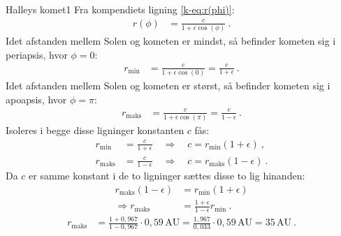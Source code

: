 \begin{opgave}{Halleys komet}{1}
\opg Fra kompendiets ligning \eqref{k-eq:r(phi)}:
\begin{align*}
	r(\phi) &= \frac{c}{1+\epsilon\cos(\phi)} \: .
\end{align*}
Idet afstanden mellem Solen og kometen er mindst, så befinder kometen sig i periapsis, hvor $\phi = 0$:
\begin{align*}
	r_{\mathrm{min}} &= \frac{c}{1+\epsilon\cos(0)}
	= \frac{c}{1+\epsilon} \: .
\end{align*}
Idet afstanden mellem Solen og kometen er størst, så befinder kometen sig i apoapsis, hvor $\phi = \pi$:
\begin{align*}
	r_{\mathrm{maks}} &= \frac{c}{1+\epsilon\cos(\pi)}
	= \frac{c}{1-\epsilon} \: .
\end{align*}
Isoleres i begge disse ligninger konstanten $c$ fås:
\begin{align*}
	r_{\mathrm{min}} &= \frac{c}{1+\epsilon} \quad \Rightarrow \quad c = r_{\mathrm{min}} (1+\epsilon) \: ,\\
	r_{\mathrm{maks}} &= \frac{c}{1-\epsilon} \quad \Rightarrow \quad c = r_{\mathrm{maks}} (1-\epsilon) \: .
\end{align*}
Da $c$ er samme konstant i de to ligninger sættes disse to lig hinanden:
\begin{align*}
	r_{\mathrm{maks}} (1-\epsilon) &= r_{\mathrm{min}} (1+\epsilon) \\
	\Rightarrow r_{\mathrm{maks}} &= \frac{1+\epsilon}{1-\epsilon} r_{\mathrm{min}} \: .
\end{align*}
%
\opg \begin{align*}
	r_{\mathrm{maks}} &= \frac{1+0,967}{1-0,967} \cdot 0,59 \, \text{AU} = \frac{1,967}{0,033} \cdot 0,59 \, \text{AU} = 35 \, \text{AU} \: .
\end{align*}
\end{opgave}
%
%
